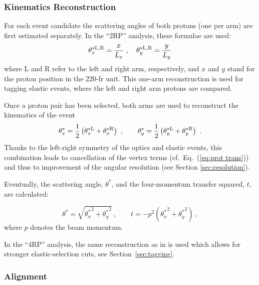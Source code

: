 \subsubsection{Kinematics Reconstruction}
\label{sec:kinematics}

For each event candidate the scattering angles of both protons (one per arm) are first estimated separately. In the ``2RP'' analysis, these formulae are used:
\begin{equation}
\label{eq:kin 1a}
	\theta^{*\rm L,R}_x = {x\over L_x}\ ,\quad \theta^{*\rm L,R}_y = {y\over L_y}
\end{equation}
where L and R refer to the left and right arm, respectively, and $x$ and $y$ stand for the proton position in the 220-fr unit. This one-arm reconstruction is used for tagging elastic events, where the left and right arm protons are compared.

Once a proton pair has been selected, both arms are used to reconstruct the kinematics of the event
\begin{equation}
\label{eq:kin 2a}
		\theta_x^* = {1\over 2} \left( \theta^{*\rm L}_x + \theta^{*\rm R}_x \right)\ ,\qquad
		\theta_y^* = {1\over 2} \left( \theta^{*\rm L}_y + \theta^{*\rm R}_y \right)\ .
\end{equation}
Thanks to the left-right symmetry of the optics and elastic events, this combination leads to cancellation of the vertex terms (cf.~Eq.~(\ref{eq:prot trans})) and thus to improvement of the angular resolution (see Section \ref{sec:resolution}).

Eventually, the scattering angle, $\theta^*$, and the four-momentum transfer squared, $t$, are calculated:

\begin{equation}
\label{eq:th t}
\theta^* = \sqrt{{\theta_x^*}^2 + {\theta_y^*}^2}\ ,\qquad t = - p^2 ({\theta_x^*}^2 + {\theta_y^*}^2)\ ,
\end{equation}
where $p$ denotes the beam momentum.

In the ``4RP'' analysis, the same reconstruction as in \cite{totem-8tev-1km} is used which allows for stronger elastic-selection cuts, see Section~\ref{sec:tagging}.




\subsubsection{Alignment}
\label{sec:alignment}

